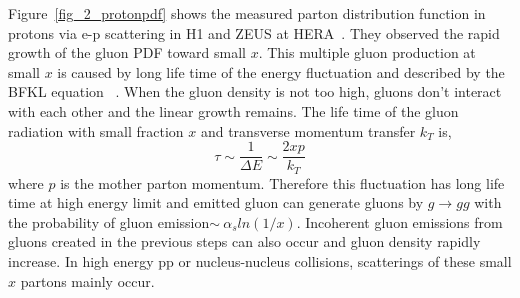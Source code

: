 Figure~\ref{fig_2_protonpdf} shows the measured parton distribution function in protons via e-p scattering in H1 and ZEUS at HERA~\cite{bib_hera}.
They observed the rapid growth of the gluon PDF toward small $x$. 
This multiple gluon production at small $x$ is caused by long life time of the energy fluctuation and described by the BFKL equation ~\cite{bib_bfkl}. 
When the gluon density is not too high, gluons don't interact with each other and the linear growth remains. 
The life time of the gluon radiation with small fraction $x$ and transverse momentum transfer $k_{T}$ is, 
\begin{equation}
	\tau  \sim  \frac{1}{\Delta E} \sim \frac{2xp}{k_{T}}
\end{equation}
where $p$ is the mother parton momentum. 
Therefore this fluctuation has long life time at high energy limit and emitted gluon can generate gluons by $g\rightarrow gg$ with the probability of gluon emission$\sim~\alpha_{s}ln(1/x)$. 
Incoherent gluon emissions from gluons created in the previous steps can also occur and gluon density rapidly increase. 
In high energy pp or nucleus-nucleus collisions, scatterings of these small $x$ partons mainly occur. 

